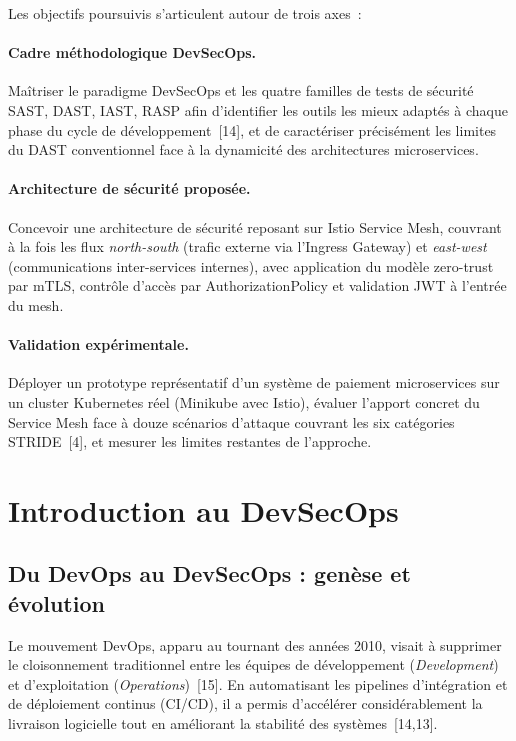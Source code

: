 Les objectifs poursuivis s'articulent autour de trois axes~:

\paragraph{Cadre méthodologique DevSecOps.}
Maîtriser le paradigme DevSecOps et les quatre familles de tests de sécurité
SAST, DAST, IAST, RASP afin d'identifier les outils les mieux adaptés à chaque
phase du cycle de développement~[14], et de caractériser précisément les limites
du DAST conventionnel face à la dynamicité des architectures microservices.

\paragraph{Architecture de sécurité proposée.}
Concevoir une architecture de sécurité reposant sur Istio Service Mesh,
couvrant à la fois les flux \emph{north-south} (trafic externe via l'Ingress
Gateway) et \emph{east-west} (communications inter-services internes), avec
application du modèle zero-trust par mTLS, contrôle d'accès par
AuthorizationPolicy et validation JWT à l'entrée du mesh.

\paragraph{Validation expérimentale.}
Déployer un prototype représentatif d'un système de paiement microservices sur
un cluster Kubernetes réel (Minikube avec Istio), évaluer l'apport concret du
Service Mesh face à douze scénarios d'attaque couvrant les six catégories
STRIDE~[4], et mesurer les limites restantes de l'approche.

\section{Introduction au DevSecOps}
\label{sec:devsecops}

\subsection{Du DevOps au DevSecOps : genèse et évolution}

Le mouvement DevOps, apparu au tournant des années 2010, visait à supprimer le
cloisonnement traditionnel entre les équipes de développement
(\emph{Development}) et d'exploitation (\emph{Operations})~[15]. En automatisant
les pipelines d'intégration et de déploiement continus (CI/CD), il a permis
d'accélérer considérablement la livraison logicielle tout en améliorant la
stabilité des systèmes~[14,13].

